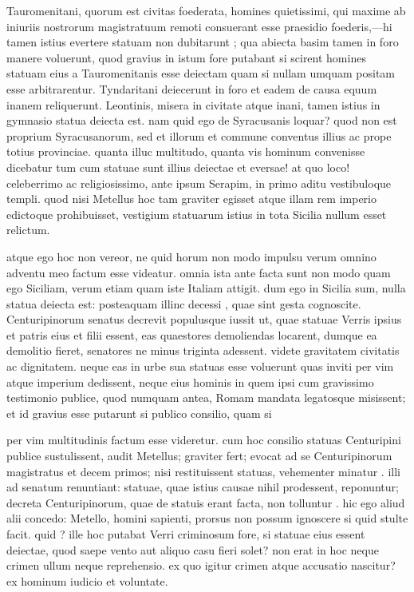  Tauromenitani, quorum est civitas foederata, homines quietissimi, qui maxime ab iniuriis nostrorum magistratuum remoti consuerant esse praesidio foederis,—hi tamen istius evertere statuam non dubitarunt ; qua abiecta basim tamen in foro manere voluerunt, quod gravius in istum fore putabant si scirent homines statuam eius a Tauromenitanis esse deiectam quam si nullam umquam positam esse arbitrarentur. Tyndaritani deiecerunt in foro et eadem de causa equum inanem reliquerunt. Leontinis, misera in civitate atque inani, tamen istius in gymnasio statua deiecta est. nam quid ego de Syracusanis loquar? quod non est proprium Syracusanorum, sed et illorum et commune conventus illius ac prope totius provinciae. quanta illuc multitudo, quanta vis hominum convenisse dicebatur tum cum statuae sunt illius deiectae et eversae! at quo loco! celeberrimo ac religiosissimo, ante ipsum Serapim, in primo aditu vestibuloque templi. quod nisi Metellus hoc tam graviter egisset atque illam rem imperio edictoque prohibuisset, vestigium statuarum istius in tota Sicilia nullum esset relictum.

 atque ego hoc non vereor, ne quid horum non modo impulsu verum omnino adventu meo factum esse videatur. omnia ista ante facta sunt non modo quam ego Siciliam, verum etiam quam iste Italiam attigit. dum ego in Sicilia sum, nulla statua deiecta est: posteaquam illinc decessi , quae sint gesta cognoscite. Centuripinorum senatus decrevit populusque iussit ut, quae statuae Verris ipsius et patris eius et filii essent, eas quaestores demoliendas locarent, dumque ea demolitio fieret, senatores ne minus triginta adessent. videte gravitatem civitatis ac dignitatem. neque eas in urbe sua statuas esse voluerunt quas inviti per vim atque imperium dedissent, neque eius hominis in quem ipsi cum gravissimo testimonio publice, quod numquam antea, Romam mandata legatosque misissent; et id gravius esse putarunt si publico consilio, quam si

 per vim multitudinis factum esse videretur. cum hoc consilio statuas Centuripini publice sustulissent, audit Metellus; graviter fert; evocat ad se Centuripinorum magistratus et decem primos; nisi restituissent statuas, vehementer minatur . illi ad senatum renuntiant: statuae, quae istius causae nihil prodessent, reponuntur; decreta Centuripinorum, quae de statuis erant facta, non tolluntur . hic ego aliud alii concedo: Metello, homini sapienti, prorsus non possum ignoscere si quid stulte facit. quid ? ille hoc putabat Verri criminosum fore, si statuae eius essent deiectae, quod saepe vento aut aliquo casu fieri solet? non erat in hoc neque crimen ullum neque reprehensio. ex quo igitur crimen atque accusatio nascitur? ex hominum iudicio et voluntate.

